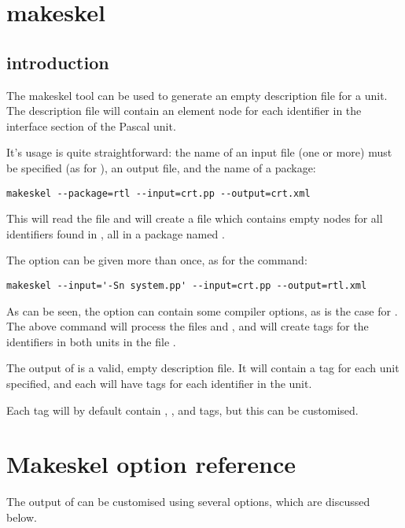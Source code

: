 \section{makeskel}
\label{se:makeskel}

\subsection{introduction}
\label{suse:makeskelintro}
The makeskel tool can be used to generate an empty description file 
for a unit. The description file will contain an element node for each
identifier in the interface section of the Pascal unit. 

It's usage is quite straightforward: the name of an input file 
(one or more) must be specified (as for \fpdoc), an output file,
and the name of a package:
\begin{verbatim}
makeskel --package=rtl --input=crt.pp --output=crt.xml
\end{verbatim}
This will read the file  and will create a file 
which contains empty nodes for all identifiers found in , all
in a package named .

The  option can be given more than once, as for the 
command:
\begin{verbatim}
makeskel --input='-Sn system.pp' --input=crt.pp --output=rtl.xml
\end{verbatim}
As can be seen, the  option can contain some compiler options,
as is the case for \fpdoc. The above command will process the files
 and , and will create  tags 
for the identifiers in both units in the file .

The output of  is a valid, empty description file. It will
contain a  tag for each unit specified, and each 
will have  tags for each identifier in the unit. 

Each  tag will by default contain , ,
 and  tags, but this can be customised.

\section{Makeskel option reference}
\label{se:makeskeloption}
The output of  can be customised using several options, which
are discussed below.

